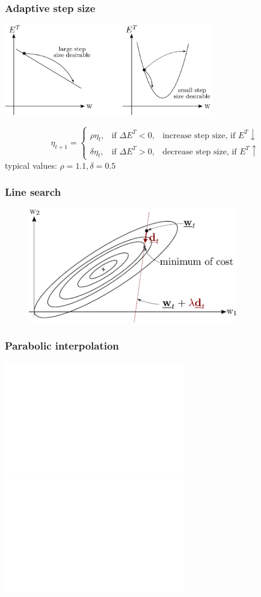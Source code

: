 \begin{frame} \frametitle{Adaptive step size}
\begin{center} \includegraphics[height=4cm]{img/section1_fig25.pdf} \end{center}
\[ \eta_{t + 1} = \left \{ 
	\begin{array}{lll}
		\rho \eta_t, 
			& \text{if } \Delta E^T < 0,
			& \text{increase step size, if } E^T \downarrow \\
		\delta \eta_t, 
			& \text{if } \Delta E^T > 0,
			& \text{decrease step size, if } E^T \uparrow 
	\end{array} \right.
\]
typical values: $\rho = 1.1, \delta = 0.5$
\end{frame}

\begin{frame}\frametitle{Line search}
    \begin{figure}[h]
    \centering   
    \includegraphics[height=5cm]{img/section1_fig26}
    \end{figure}
\end{frame}

\begin{frame}\frametitle{Parabolic interpolation}
	\begin{center} 
		\includegraphics<1>[height=5cm]{img/parabolicInterpolation_clean_a.pdf} 
		\includegraphics<2>[height=5cm]{img/parabolicInterpolation_clean_b.pdf} 
	\end{center}
\end{frame}


